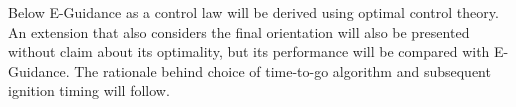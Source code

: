 Below E-Guidance as a control law will be derived using optimal control theory. An extension that also considers the final orientation will also be presented without claim about its optimality, but its performance will be compared with E-Guidance. The rationale behind choice of time-to-go algorithm and subsequent ignition timing will follow.

%
%
%
%
%
%

